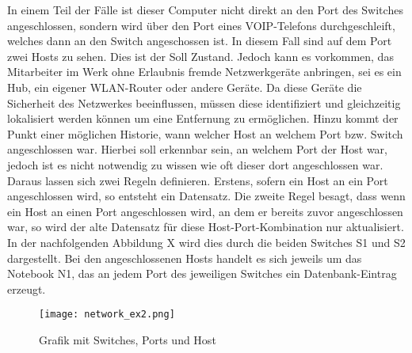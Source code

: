 In einem Teil der Fälle ist dieser Computer nicht direkt an den Port des Switches angeschlossen, sondern wird über den Port eines VOIP-Telefons durchgeschleift, welches dann an den Switch angeschossen ist.
In diesem Fall sind auf dem Port zwei Hosts zu sehen.
Dies ist der Soll Zustand. Jedoch kann es vorkommen, das Mitarbeiter im Werk ohne Erlaubnis fremde Netzwerkgeräte anbringen, sei es ein Hub, ein eigener WLAN-Router oder andere Geräte. Da diese Geräte die Sicherheit des Netzwerkes beeinflussen, müssen diese identifiziert und gleichzeitig lokalisiert werden können um eine Entfernung zu ermöglichen.
Hinzu kommt der Punkt einer möglichen Historie, wann welcher Host an welchem Port bzw. Switch angeschlossen war. Hierbei soll erkennbar sein, an welchem Port der Host war, jedoch ist es nicht notwendig zu wissen wie oft dieser dort angeschlossen war.
Daraus lassen sich zwei Regeln definieren. Erstens, sofern ein Host an ein Port angeschlossen wird, so entsteht ein Datensatz. Die zweite Regel besagt, dass wenn ein Host an einen Port angeschlossen wird, an dem er bereits zuvor angeschlossen war, so wird der alte Datensatz für diese Host-Port-Kombination nur aktualisiert. 
In der nachfolgenden Abbildung X wird dies durch die beiden Switches S1 und S2 dargestellt. Bei den angeschlossenen Hosts handelt es sich jeweils um das Notebook N1, das an jedem Port des jeweiligen Switches ein Datenbank-Eintrag erzeugt.\\

\begin{figure}[H]
\centering
\texttt{[image: network\_ex2.png]}
\caption{Grafik mit Switches, Ports und Host}
\label{fig:show_s1_s2_p1_n1}
\end{figure}


